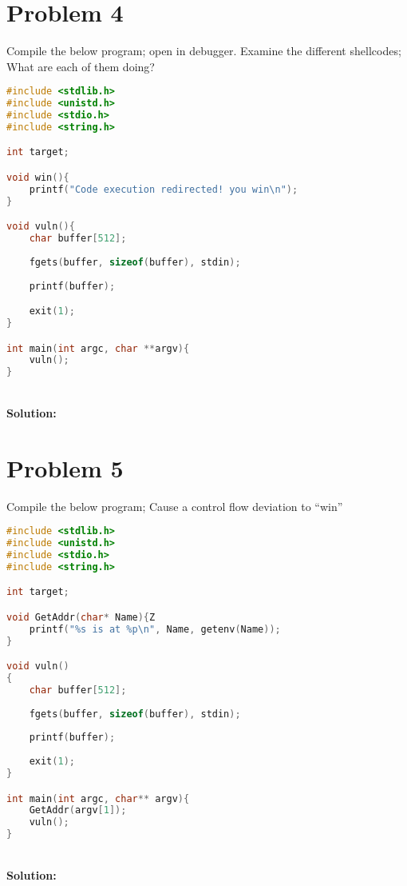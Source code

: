 \documentclass[10.9pt]{article}
\newcommand\tab[1][0.5cm]{\hspace*{#1}}
\begin{document}
\section{Problem 4}
\tab Compile the below program; open in debugger. Examine the different shellcodes; What are
each of them doing?
\begin{lstlisting}[language=C]
#include <stdlib.h>
#include <unistd.h>
#include <stdio.h>
#include <string.h>

int target;

void win(){
	printf("Code execution redirected! you win\n");
}

void vuln(){
	char buffer[512];
	
	fgets(buffer, sizeof(buffer), stdin);
	
	printf(buffer);

	exit(1);
}

int main(int argc, char **argv){
	vuln();
}
\end{lstlisting}
\textbf{\\Solution:\\}


\section{Problem 5}
\tab Compile the below program; Cause a control flow deviation to “win”
\begin{lstlisting}[language=C]
#include <stdlib.h>
#include <unistd.h>
#include <stdio.h>
#include <string.h>

int target;

void GetAddr(char* Name){Z
	printf("%s is at %p\n", Name, getenv(Name));
}

void vuln()
{
	char buffer[512];
	
	fgets(buffer, sizeof(buffer), stdin);
	
	printf(buffer);
	
	exit(1);	
}

int main(int argc, char** argv){
	GetAddr(argv[1]);
	vuln();
}
\end{lstlisting}
\textbf{\\Solution:\\}
\end{document}
